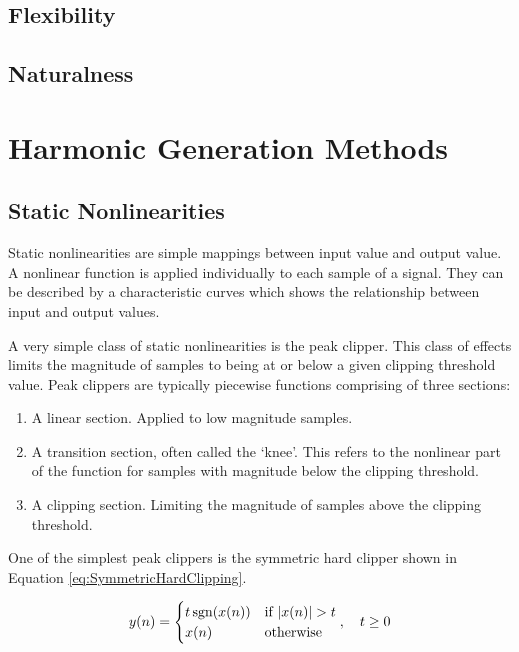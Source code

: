 	\subsection{Flexibility}
	\label{sec:Excitation-Evaluation-Flexibility}

	\subsection{Naturalness}
	\label{sec:Excitation-Evaluation-Naturalness}

\section{Harmonic Generation Methods}
\label{sec:Excitation-Methods}

	\subsection{Static Nonlinearities}
	\label{sec:Excitation-Statics}
		Static nonlinearities are simple mappings between input value and output value. A nonlinear function is
		applied individually to each sample of a signal. They can be described by a characteristic curves which
		shows the relationship between input and output values.
		
		A very simple class of static nonlinearities is the peak clipper. This class of effects limits the
		magnitude of samples to being at or below a given clipping threshold value. Peak clippers are typically
		piecewise functions comprising of three sections:

		\begin{enumerate}
			\item A linear section. Applied to low magnitude samples.
			\item A transition section, often called the `knee'. This refers to the nonlinear part of the
				function for samples with magnitude below the clipping threshold.
			\item A clipping section. Limiting the magnitude of samples above the clipping threshold.
		\end{enumerate}

		One of the simplest peak clippers is the symmetric hard clipper shown in Equation
		\ref{eq:SymmetricHardClipping}.

		\begin{equation}
			y(n) = \begin{cases}
				t\operatorname{sgn}(x(n)) & \text{if $|x(n)| > t$} \\
				x(n) & \text{otherwise}
			\end{cases}, \quad t \geq 0
			\label{eq:SymmetricHardClipping}
		\end{equation}

